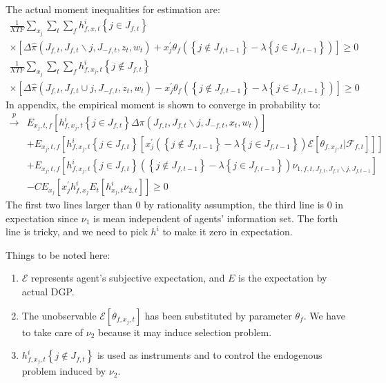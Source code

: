 \documentclass{book}
\theoremstyle{plain}
\theoremstyle{definition}
\begin{document}
The actual moment inequalities for estimation are:
\[\begin{array}{l}{\frac{1}{X T F} \sum_{x_{j}} \sum_{t} \sum_{f} h_{f, x, t}^{i}\left\{j \in J_{f, t}\right\}} \\ { \times\left[\Delta \hat{\pi}\left(J_{f, t}, J_{f, t} \backslash j, J_{-f, t}, z_{t}, w_{t}\right)+x_{j}^{\prime} \theta_{f}\left(\left\{j \notin J_{f, t-1}\right\}-\lambda\left\{j \in J_{f, t-1}\right\}\right)\right] \geq 0}\end{array} \tag{8}\]
\[\begin{array}{l}{\frac{1}{X T F} \sum_{x_{j}} \sum_{t} \sum_{f} h_{f, x_{j}, t}^{i}\left\{j \notin J_{f, t}\right\}} \\ { \times\left[\Delta \hat{\pi}\left(J_{f, t}, J_{f, t} \cup j, J_{-f, t}, z_{t}, w_{t}\right)-x_{j}^{\prime} \theta_{f}\left(\left\{j \notin J_{f, t-1}\right\}-\lambda\left\{j \in J_{f, t-1}\right\}\right)\right] \geq 0}\end{array} \tag{9}\]
In appendix, the empirical moment is shown to converge in probability to:
\begin{align*}
	\stackrel{p}{\rightarrow} & E_{x_{j}, t, f}\left[h_{f, x_{j}, t}^{i}\left\{j \in J_{f, t}\right\} \Delta \pi\left(J_{f, t}, J_{f, t} \backslash j, J_{-f, t}, x_{t}, w_{t}\right)\right] \\
	& +E_{x_{j}, t, f}\left[h_{f, x_{j}, t}^{i}\left\{j \in J_{f, t}\right\}\left[x_{j}^{\prime}\left(\left\{j \notin J_{f, t-1}\right\}-\lambda\left\{j \in J_{f, t-1}\right\}\right) \mathscr{E}\left[\theta_{f, x_{j}, t} | \mathscr{F}_{f, t}\right]\right]\right] \\
	& +E_{x_{j}, t, f}\left[h_{f, x_{j}, t}^{i}\left\{j \in J_{f, t}\right\}\left(\left\{j \notin J_{f, t-1}\right\}-\lambda\left\{j \in J_{f, t-1}\right\}\right) \nu_{1, f, t, J_{f, t}, J_{f, t} \backslash j, J_{f, t-1}}\right] \\
	& -C E_{x_{j}}\left[x_{j}^{\prime} h_{f, x_{j}}^{i} E_{t}\left[h_{x_{j}, t}^{i} \nu_{2, t}\right]\right] \geq 0
\end{align*}
The first two lines larger than 0 by rationality assumption, the third line is 0 in expectation since $\nu_1$ is mean independent of agents' information set. The forth line is tricky, and we need to pick $h^i$ to make it zero in expectation.

Things to be noted here:
\begin{enumerate}
	\item $\mathcal E$ represents agent's subjective expectation, and $E$ is the expectation by actual DGP.
	\item The unobservable $\mathcal E[\theta_{f,x_j,t}]$ has been substituted by parameter $\theta_f$. We have to take care of $\nu_2$ because it may induce selection problem.
	\item $h_{f, x_{j}, t}^{i}\left\{j \notin J_{f, t}\right\}$ is used as instruments and to control the endogenous problem induced by $\nu_2$.
\end{enumerate}
\end{document}
